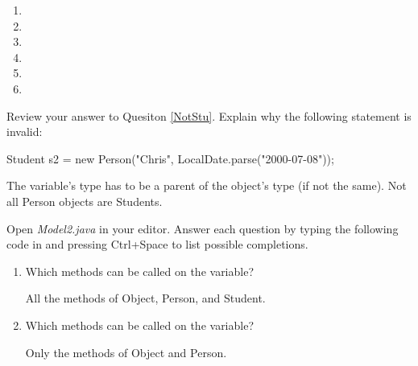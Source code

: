 \setlength{\defaultwidth}{4em}

\begin{multicols}{2}
\begin{enumerate}
\item {} 

\item {} 

\item {} 

\item {} 

\item {} 

\item {} 
\end{enumerate}
\end{multicols}


\Q Review your answer to Quesiton \ref{NotStu}.
Explain why the following statement is invalid:

\begin{javalst}
Student s2 = new Person("Chris", LocalDate.parse("2000-07-08"));
\end{javalst}

\begin{answer}[3em]
The variable's type has to be a parent of the object's type (if not the same).
Not all Person objects are Students.
\end{answer}


\Q Open \textit{Model2.java} in your editor.
Answer each question by typing the following code in  and pressing \textsf{Ctrl+Space} to list possible completions.

\begin{enumerate}
\item Which methods can be called on the  variable? \hspace{2em} 
\begin{answer}[1em]
All the methods of Object, Person, and Student.
\end{answer}

\item Which methods can be called on the  variable? \hspace{1em} 
\begin{answer}[1em]
Only the methods of Object and Person.
\end{answer}
\end{enumerate}

